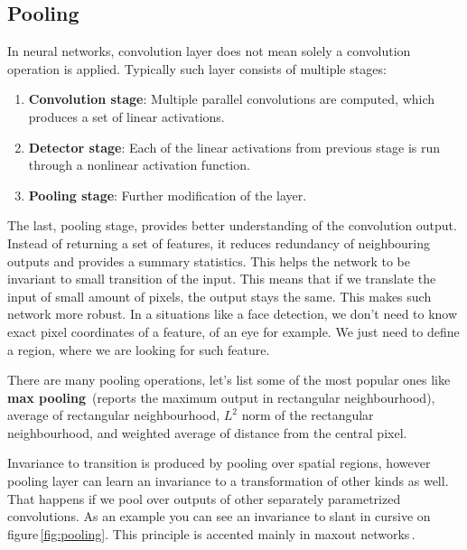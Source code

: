 \subsection{Pooling}
\label{ss:pooling}

In neural networks, convolution layer does not mean solely a convolution operation is applied. Typically such layer consists of multiple stages:

\begin{enumerate}
    \item \textbf{Convolution stage}: Multiple parallel convolutions are computed, which produces a set of linear activations.
    \item \textbf{Detector stage}: Each of the linear activations from previous stage is run through a nonlinear activation function.
    \item \textbf{Pooling stage}: Further modification of the layer.
\end{enumerate}

The last, pooling stage, provides better understanding of the convolution output. Instead of returning a set of features, it reduces redundancy of neighbouring outputs and provides a summary statistics. This helps the network to be invariant to small transition of the input. This means that if we translate the input of small amount of pixels, the output stays the same. This makes such network more robust. In a situations like a face detection, we don't need to know exact pixel coordinates of a feature, of an eye for example. We just need to define a region, where we are looking for such feature.

There are many pooling operations, let's list some of the most popular ones like \textbf{max pooling}\,\cite{maxpooling} (reports the maximum output in rectangular neighbourhood), average of rectangular neighbourhood, $L^2$ norm of the rectangular neighbourhood, and weighted average of distance from the central pixel.

Invariance to transition is produced by pooling over spatial regions, however pooling layer can learn an invariance to a transformation of other kinds as well. That happens if we pool over outputs of other separately parametrized convolutions. As an example you can see an invariance to slant in cursive on figure\,\ref{fig:pooling}. This principle is accented mainly in maxout networks\,\cite{maxout}.


